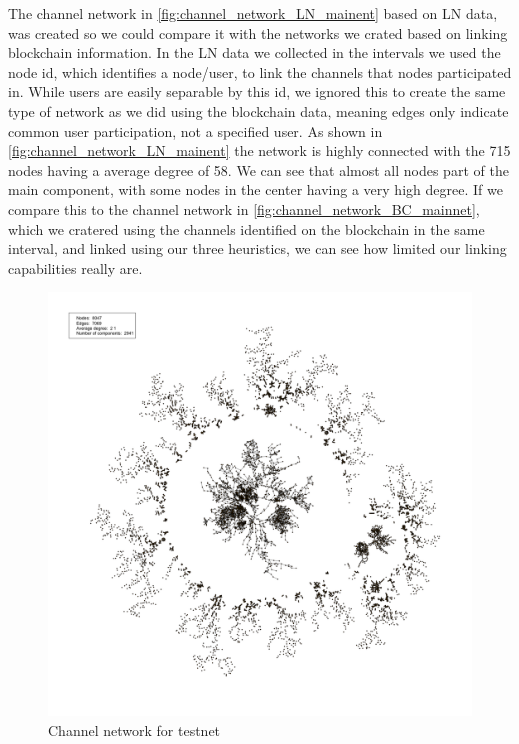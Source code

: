The channel network in \cref{fig:channel_network_LN_mainent} based on LN data, was created so we could compare it with the networks we crated based on linking blockchain information. In the LN data we collected in the intervals we used the node id, which identifies a node/user, to link the channels that nodes participated in. While users are easily separable by this id, we ignored this to create the same type of network as we did using the blockchain data, meaning edges only indicate common user participation, not a specified user. 
As shown in \cref{fig:channel_network_LN_mainent} the network is highly connected with the 715 nodes having a average degree of 58. We can see that almost all nodes part of the main component, with some nodes in the center having a very high degree.
If we compare this to the channel network in \cref{fig:channel_network_BC_mainnet}, which we cratered using the channels identified on the blockchain in the same interval, and linked using our three heuristics, we can see how limited our linking capabilities really are.

\begin{figure}[ht]
    \centering
    \includegraphics[width=13cm]{figures/graphs/cg_bc_testnet_full.png}
    \caption{Channel network for testnet}
    \label{fig:cg_testnet_full}
\end{figure}

